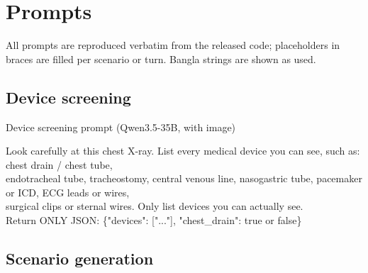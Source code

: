 \section{Prompts}\label{app:prompts}

All prompts are reproduced verbatim from the released code; placeholders in braces are filled per scenario or turn. Bangla strings are shown as used.

\subsection{Device screening}\label{app:p:screen}

\begin{promptbox}{Device screening prompt (Qwen3.5-35B, with image)}
\par{\ttfamily\scriptsize\raggedright Look carefully at this chest X-ray. List every medical device you can see, such as: chest drain / chest tube, \\\relax
endotracheal tube, tracheostomy, central venous line, nasogastric tube, pacemaker or ICD, ECG leads or wires, \\\relax
surgical clips or sternal wires. Only list devices you can actually see. \\\relax
Return ONLY JSON: \{"devices": ["..."], "chest\_drain": true or false\}\par}
\end{promptbox}

\subsection{Scenario generation}\label{app:p:scen}

